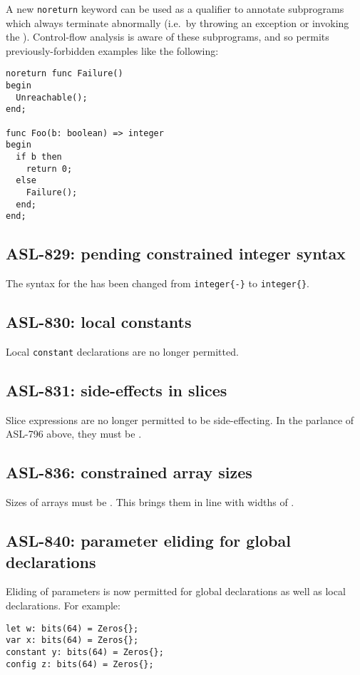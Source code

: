 A new \texttt{noreturn} keyword can be used as a qualifier to annotate subprograms which always terminate abnormally (i.e.\ by throwing an exception or invoking the \unreachablestatementterm).
Control-flow analysis is aware of these subprograms, and so permits previously-forbidden examples like the following:
\begin{lstlisting}
noreturn func Failure()
begin
  Unreachable();
end;

func Foo(b: boolean) => integer
begin
  if b then
    return 0;
  else
    Failure();
  end;
end;
\end{lstlisting}

\subsection{ASL-829: pending constrained integer syntax}

The syntax for the \pendingconstrainedintegertypeterm{} has been changed from \texttt{integer\{-\}}  to \texttt{integer\{\}}.

\subsection{ASL-830: local constants}

Local \texttt{constant} declarations are no longer permitted.

\subsection{ASL-831: side-effects in slices}

Slice expressions are no longer permitted to be side-effecting.
In the parlance of ASL-796 above, they must be \readonlyterm{}.

\subsection{ASL-836: constrained array sizes}

Sizes of arrays must be \constrainedintegersterm{}.
This brings them in line with widths of \bitvectortypesterm{}.

\subsection{ASL-840: parameter eliding for global declarations}

Eliding of parameters is now permitted for global declarations as well as local declarations.
For example:
\begin{lstlisting}
let w: bits(64) = Zeros{};
var x: bits(64) = Zeros{};
constant y: bits(64) = Zeros{};
config z: bits(64) = Zeros{};
\end{lstlisting}


